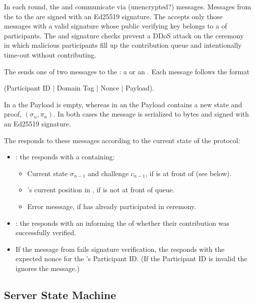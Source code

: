 In each round, the \Coordinator{} and \Contributor{} communicate via (unencrypted?) messages. Messages from the \Contributor{} to the \Coordinator{} are signed with an Ed25519 signature. The \Coordinator{} accepts only those messages with a valid signature whose public verifying key belongs to a \Registry{} of participants. The \Registry{} and signature checks prevent a DDoS attack on the ceremony in which malicious participants fill up the contribution queue and intentionally time-out without contributing.

The \Contributor{} sends one of two messages to the \Coordinator{}: a \QueryRequest{} or an \UpdateRequest{}. Each message follows the format 
\begin{center} 
    (Participant ID | Domain Tag | Nonce | Payload). 
\end{center}
In a \QueryRequest{} the Payload is empty, whereas in an \UpdateRequest{} the Payload contains a new state and proof, $(\sigma_n, \pi_n)$. In both cases the message is serialized to bytes and signed with an Ed25519 signature.

The \Coordinator{} responds to these messages according to the current state of the protocol:
\begin{itemize}
    \item \QueryRequest{}: the \Coordinator{} responds with a \QueryResponse{} containing:
        \begin{itemize}
            \item Current state $\sigma_{n-1}$ and challenge $c_{n-1}$, if \Contributor{} is at front of \Queue{} (see below).
            \item \Contributor{}'s current position in \Queue{}, if \Contributor{} is not at front of queue.
            \item Error messsage, if \Contributor{} has already participated in ceremony.
        \end{itemize}
    \item \UpdateRequest{}: the \Coordinator{} responds with an \UpdateResponse{} informing the \Contributor{} of whether their contribution was successfully verified.
    \item If the message from \Contributor{} fails signature verification, the \Coordinator{} responds with the expected nonce for the \Contributor{}'s Participant ID. (If the Participant ID is invalid the \Coordinator{} ignores the message.)
\end{itemize}

\subsection{Server State Machine}

